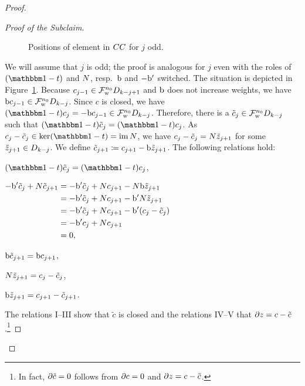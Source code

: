 \documentclass[\MainFolder/Text.tex]{subfiles}
\begin{document}
\begin{proof}
\begin{ProofList}
\begin{SubClaim}
\end{SubClaim}
\begin{proof}[Proof of the Subclaim]
\begin{figure}
\centering
{}
\caption[Illustration of weight normalization in the Loday's cyclic bicomplex.]{Positions of element in $CC$ for $j$ odd.}
\label{Fig:PosOfElLodCycBi}
\end{figure}
We will assume that $j$ is odd; the proof is analogous for $j$ even with the roles of $(\Id-\CycPermOp)$ and $N$, resp.~$\mathrm{b}$ and $-\mathrm{b}'$ switched. The situation is depicted in Figure~\ref{Fig:PosOfElLodCycBi}. Because $c_{j-1}\in \mathcal{F}^{n_0}_{\mathrm{w}} D_{k-j+1}$ and $\mathrm{b}$ does not increase weights, we have $\mathrm{b} c_{j-1} \in \mathcal{F}^{n_0}_{\mathrm{w}} D_{k-j}$. Since $c$ is closed, we have $(\Id-\CycPermOp)c_{j} = - \Hd c_{j-1} \in \Filtr^{n_0}_{\WeightMRM} \HC_{k-j}$. Therefore, there is a $\tilde{c}_j \in \mathcal{F}^{n_0}_{\mathrm{w}} D_{k-j}$ such that $(\Id-\CycPermOp)\tilde{c}_j = (\Id-\CycPermOp)c_j$. As $c_j - \tilde{c}_j \in \ker(\Id-\CycPermOp) = \im \CountOp$, we have $c_j - \tilde{c}_j = N \tilde{z}_{j+1}$ for some $\tilde{z}_{j+1}\in D_{k-j}$. We define $\tilde{c}_{j+1}\coloneqq c_{j+1} - \mathrm{b} \tilde{z}_{j+1}$. The following relations hold:
\begin{EqnList}
\item $(\Id-\CycPermOp)\tilde{c}_j = (\Id-\CycPermOp)c_j$,
\item $\begin{aligned}[t]
- \mathrm{b}' \tilde{c}_{j} + N \tilde{c}_{j+1} &= - \mathrm{b}' \tilde{c}_{j} + N c_{j+1} - N \mathrm{b} \tilde{z}_{j+1} \\
 &= - \mathrm{b}' \tilde{c}_{j} + N c_{j+1} - \mathrm{b}'N \tilde{z}_{j+1}  \\ 
&= - \mathrm{b}' \tilde{c}_{j} + N c_{j+1}  - \mathrm{b}'(c_j - \tilde{c}_j) \\ & = -\mathrm{b}'c_j + N c_{j+1} \\
& = 0,
\end{aligned}$
\item $\mathrm{b} \tilde{c}_{j+1} = \mathrm{b} c_{j+1}$,
\item $N \tilde{z}_{j+1} = c_j - \tilde{c}_j$,
\item $\mathrm{b} \tilde{z}_{j+1} = c_{j+1}- \tilde{c}_{j+1}$.
\end{EqnList}
The relations I--III show that $\tilde{c}$ is closed and the relations IV--V that $\partial z = c - \tilde{c}$.\footnote{In fact, $\partial \tilde{c} = 0$ follows from $\partial c = 0$ and $\partial z = c - \tilde{c}$.}
\renewcommand{\qed}{\hfill\textit{(Subclaim) }$\square$}


\end{proof}
\end{ProofList}
\end{proof}
\end{document}
